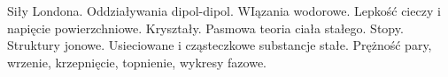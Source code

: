 Siły Londona.
Oddziaływania dipol-dipol.
WIązania wodorowe.
Lepkość cieczy i napięcie powierzchniowe.
Kryształy.
Pasmowa teoria ciała stałego.
Stopy.
Struktury jonowe.
Usieciowane i cząsteczkowe substancje stałe.
Prężność pary, wrzenie, krzepnięcie, topnienie, wykresy fazowe.
